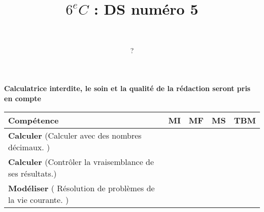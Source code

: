 \documentclass[a4paper,11pt]{exam}
\author{\ }
\date{?}
\title{$6^e C$ : DS num\'ero 5}
\begin{document}
%	

	\maketitle
	
\begin{center}
	\textbf{Calculatrice interdite, le soin et la qualité de la rédaction seront pris en compte}
\end{center}

\begin{small}
	\begin{center}
		\begin{tabular}{|@{\ }l@{\ }|@{\ }c@{\ }|@{\ }c@{\ }|@{\ }c@{\ }|@{\ }c@{\ }|}
			\hline
			\textbf{Compétence} & \textbf{MI} & \textbf{MF} & \textbf{MS} & \textbf{TBM} \\
			\hline
			\textbf{Calculer} (Calculer avec des nombres décimaux. ) &  \ \ & \ \ & \ \ & \ \  \\
			\hline	
			\textbf{Calculer} (Contrôler la vraisemblance de ses résultats.) & \ \ & \ \ &  \ \  & \ \ \\
			\hline
			\textbf{Modéliser} ( Résolution de problèmes de la vie courante. ) &  \ \ & \ \ & \ \ & \ \  \\
			\hline
		\end{tabular}
	\end{center}
\end{small}	

	
	
	




%






\label{LastPage}

%
\end{document}

